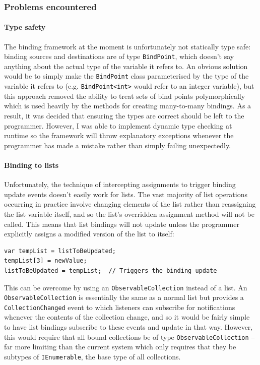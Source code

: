 \documentclass[12pt,twoside,notitlepage]{report}
\begin{document}
\subsubsection{Problems encountered}

\paragraph{Type safety}

The binding framework at the moment is unfortunately not statically type safe: binding sources and destinations are of type \texttt{BindPoint}, which doesn't say anything about the actual type of the variable it refers to. An obvious solution would be to simply make the \texttt{BindPoint} class parameterised by the type of the variable it refers to (e.g. \texttt{BindPoint<int>} would refer to an integer variable), but this approach removed the ability to treat sets of bind points polymorphically which is used heavily by the methods for creating many-to-many bindings. As a result, it was decided that ensuring the types are correct should be left to the programmer. However, I was able to implement dynamic type checking at runtime so the framework will throw explanatory exceptions whenever the programmer has made a mistake rather than simply failing unexpectedly.

\paragraph{Binding to lists}

Unfortunately, the technique of intercepting assignments to trigger binding update events doesn't easily work for lists. The vast majority of list operations occurring in practice involve changing elements of the list rather than reassigning the list variable itself, and so the list's overridden assignment method will not be called. This means that list bindings will not update unless the programmer explicitly assigns a modified version of the list to itself:

\begin{lstlisting}[language={[Sharp]C}, caption={Explicitly reassigning a list to trigger a binding update}]
var tempList = listToBeUpdated;
tempList[3] = newValue;
listToBeUpdated = tempList;  // Triggers the binding update
\end{lstlisting}

This can be overcome by using an \texttt{ObservableCollection} instead of a list. An \texttt{ObservableCollection} is essentially the same as a normal list but provides a \texttt{CollectionChanged} event to which listeners can subscribe for notifications whenever the contents of the collection change, and so it would be fairly simple to have list bindings subscribe to these events and update in that way. However, this would require that all bound collections be of type \texttt{ObservableCollection} -- far more limiting than the current system which only requires that they be subtypes of \texttt{IEnumerable}, the base type of all collections.
\end{document}
